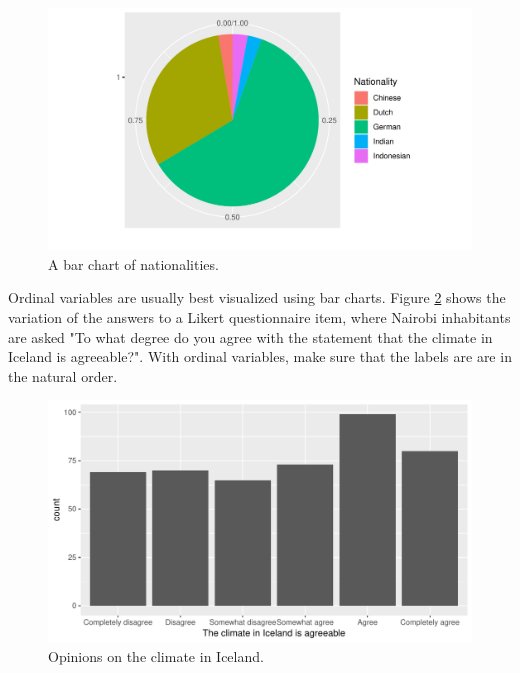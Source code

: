 \documentclass[]{report}\usepackage[]{graphicx}\usepackage[]{color}
\makeatletter
\def\maxwidth{ %
  \ifdim\Gin@nat@width>\linewidth
    \linewidth
  \else
    \Gin@nat@width
  \fi
}
\newenvironment{knitrout}{}{} %
\makeatother
\begin{document}
\begin{knitrout}
\color{fgcolor}\begin{figure}

{\centering \includegraphics[width=\maxwidth]{figure/nationality_3-1} 

}

\caption[A bar chart of nationalities]{A bar chart of nationalities.}\label{fig:nationality_3}
\end{figure}


\end{knitrout}


Ordinal variables are usually best visualized using bar charts. Figure \ref{fig:climate_1} shows the variation of the answers to a Likert questionnaire item, where Nairobi inhabitants are asked "To what degree do you agree with the statement that the climate in Iceland is agreeable?". With ordinal variables, make sure that the labels are are in the natural order. 

\begin{figure}

{\centering \includegraphics[width=\maxwidth]{figure/climate_1-1} 

}

\caption[Opinions on the climate in Iceland]{Opinions on the climate in Iceland.}\label{fig:climate_1}
\end{figure}
\end{document}
